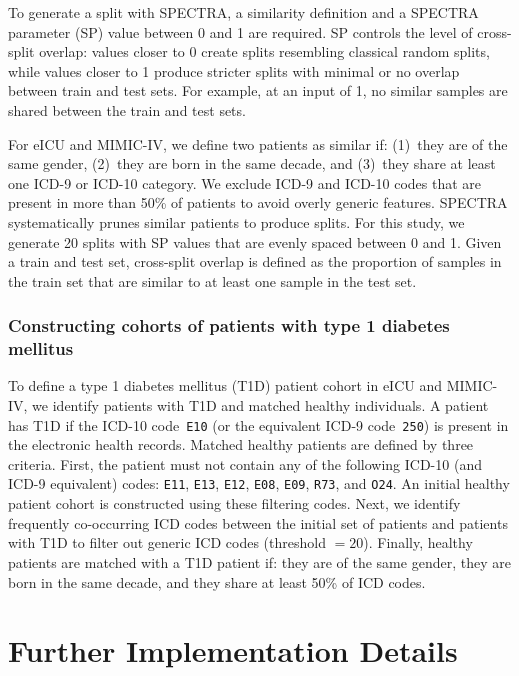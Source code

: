 To generate a split with SPECTRA, a similarity definition and a SPECTRA parameter (SP) value between 0 and 1 are required. SP controls the level of cross-split overlap: values closer to 0 create splits resembling classical random splits, while values closer to 1 produce stricter splits with minimal or no overlap between train and test sets. For example, at an input of 1, no similar samples are shared between the train and test sets.

For eICU and MIMIC-IV, we define two patients as similar if: (1)~they are of the same gender, (2)~they are born in the same decade, and (3)~they share at least one ICD-9 or ICD-10 category. We exclude ICD-9 and ICD-10 codes that are present in more than 50\% of patients to avoid overly generic features. SPECTRA systematically prunes similar patients to produce splits. For this study, we generate 20 splits with SP values that are evenly spaced between 0 and 1. Given a train and test set, cross-split overlap is defined as the proportion of samples in the train set that are similar to at least one sample in the test set.


\subsubsection{Constructing cohorts of patients with type 1 diabetes mellitus}

To define a type 1 diabetes mellitus (T1D) patient cohort in eICU and MIMIC-IV, we identify patients with T1D and matched healthy individuals. A patient has T1D if the ICD-10 code~\texttt{E10} (or the equivalent ICD-9 code~\texttt{250}) is present in the electronic health records. Matched healthy patients are defined by three criteria. First, the patient must not contain any of the following ICD-10 (and ICD-9 equivalent) codes: \texttt{E11}, \texttt{E13}, \texttt{E12}, \texttt{E08}, \texttt{E09}, \texttt{R73}, and \texttt{O24}. An initial healthy patient cohort is constructed using these filtering codes. Next, we identify frequently co-occurring ICD codes between the initial set of patients and patients with T1D to filter out generic ICD codes (threshold $= 20$). Finally, healthy patients are matched with a T1D patient if: they are of the same gender, they are born in the same decade, and they share at least 50\% of ICD codes.



\section{Further Implementation Details}\label{appendix:implementation}

